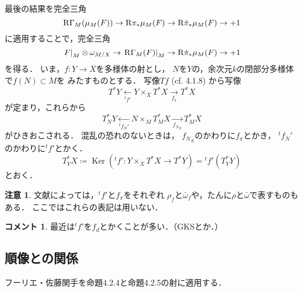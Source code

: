 \documentclass[uplatex,dvipdfmx,a4paper,10pt,draft]{jsarticle}
\theoremstyle{definition}
\newcommand{\Ker}{\mathop{\mathrm{Ker}}\nolimits} %
\numberwithin{equation}{section}
\newcommand{\RG}{\mathop{\mathrm{R}\hspace{-0pt}\Gamma}\nolimits}
\newcommand{\Rder}{\mathrm{R}}
\newcommand{\tens}[1][]{\mathbin{\otimes_{\raise1.5ex\hbox to-.1em{}{#1}}}}
\newcommand{\mres}[2][]{{\left.{#1}\right\rvert}_{#2}}
\theoremstyle{mystyle}
\newtheorem{CMT}[AXM]{コメント}
\newtheorem{RMK}[mythm]{注意}
\begin{document}
最後の結果を完全三角
\[
    \RG_M(\mu_{M}(F))\to
    \Rder{\pi_{\ast}}\mu_{M}(F)\to
    \Rder{\dot{\pi}_{\ast}\mu_{M}(F)\to+1}
\]
に適用することで，完全三角
\begin{equation}
    \mres[F]{M}\tens[]\omega_{M/X}\to
    \mres[\RG_M(F)]{M}\to
    \Rder{\dot{\pi}_{\ast}\mu_{M}(F)\to+1}    
\end{equation}
を得る．
いま，\(f\colon Y\to X\)を多様体の射とし，
\(N\)を\(Y\)の，余次元\(k\)の閉部分多様体で\(f(N)\subset M\)を
みたすものとする．
写像\(Tf\) (cf. 4.1.8) から写像
\begin{equation}
    T^{\ast}Y
    \underset{{}^{t}f'}{\longleftarrow}
    Y\times_{X}T^{\ast}X
    \underset{f_{\pi}}{\longrightarrow}
    T^{\ast}X
\end{equation}
が定まり，これらから
\begin{equation}
    T_{N}^{\ast}Y
    \underset{{}^{t}f_{N}'}{\longleftarrow}
    N\times_{M}T_{M}^{\ast}X
    \underset{{f_{N}}_{\pi}}{\longrightarrow}
    T_{M}^{\ast}X
\end{equation}
がひきおこされる．
混乱の恐れのないときは，
\({f_{N}}_{\pi}\)のかわりに\({f}_{\pi}\)とかき，
\({}^{t}f_{N}'\)のかわりに\({}^{t}f'\)とかく．
\begin{equation}
    T^{\ast}_{Y}X
    \coloneqq
    \Ker({}^{t}f'\colon
    Y\times_{X}T^{\ast}X
    \to T^{\ast}Y)
    ={}^{t}f'(T^{\ast}_{Y}Y)
\end{equation}
とおく．

\begin{RMK}
    文献によっては，\({}^{t}f'\)と\(f_{\pi}\)をそれぞれ
    \(\rho_{f}\)と\(\bar{\omega}_{f}\)や，たんに\(\rho\)と\(\bar{\omega}\)で表すものもある．
    ここではこれらの表記は用いない．
\end{RMK}

\begin{CMT}
    最近は\({}^{t}f'\)を\(f_d\)とかくことが多い．（GKSとか．）
\end{CMT}

\subsection*{順像との関係}


フーリエ・佐藤関手を命題4.2.4と命題4.2.5の射に適用する．
\end{document}
